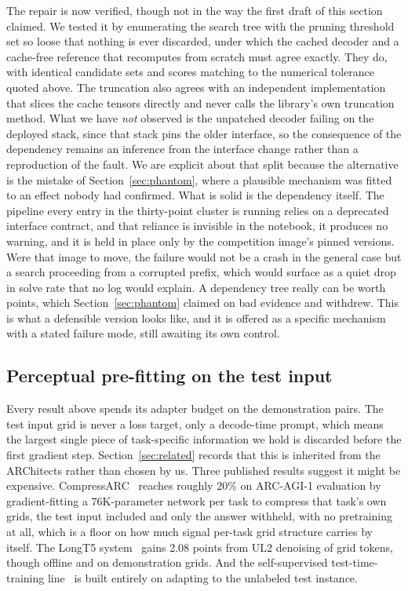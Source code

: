 \documentclass[11pt]{article}
\begin{document}
The repair is now verified, though not in the way the first draft of this section claimed. We tested it
by enumerating the search tree with the pruning threshold set so loose that nothing is ever discarded,
under which the cached decoder and a cache-free reference that recomputes from scratch must agree
exactly. They do, with identical candidate sets and scores matching to the numerical tolerance quoted
above. The truncation also agrees with an independent implementation that slices the cache tensors
directly and never calls the library's own truncation method. What we have \emph{not} observed is the
unpatched decoder failing on the deployed stack, since that stack pins the older interface, so the
consequence of the dependency remains an inference from the interface change rather than a reproduction
of the fault. We are explicit about that split because the alternative is the mistake of
Section~\ref{sec:phantom}, where a plausible mechanism was fitted to an effect nobody had confirmed.
What is solid is the dependency itself. The pipeline every entry in the
thirty-point cluster is running relies on a deprecated interface contract, and that reliance is invisible in
the notebook, it produces no warning, and it is held in place only by the competition image's pinned
versions. Were that image to move, the failure would not be a crash in the general case but a search proceeding
from a corrupted prefix, which would surface as a quiet drop in solve rate that no log would explain.
A dependency tree really can be worth points, which Section~\ref{sec:phantom} claimed on bad evidence
and withdrew. This is what a defensible version looks like, and it is offered as a specific mechanism
with a stated failure mode, still awaiting its own control.

\subsection{Perceptual pre-fitting on the test input}
\label{sec:prefit}
Every result above spends its adapter budget on the demonstration pairs. The test input grid is
never a loss target, only a decode-time prompt, which means the largest single piece of
task-specific information we hold is discarded before the first gradient step. Section~\ref{sec:related}
records that this is inherited from the ARChitects rather than chosen by us. Three published results
suggest it might be expensive. CompressARC~\cite{compressarc} reaches roughly 20\% on ARC-AGI-1
evaluation by gradient-fitting a 76K-parameter network per task to compress that task's own grids,
the test input included and only the answer withheld, with no pretraining at all, which is a floor
on how much signal per-task grid structure carries by itself. The LongT5 system~\cite{longt5arc}
gains 2.08 points from UL2 denoising of grid tokens, though offline and on demonstration grids.
And the self-supervised test-time-training line~\cite{sun2020,ttmae} is built entirely on adapting
to the unlabeled test instance.
\end{document}
